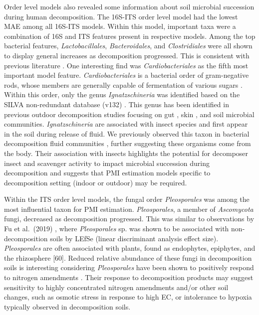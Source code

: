 \documentclass[
  10pt,
  letterpaper,
]{article}
\begin{document}
Order level models also revealed some information about soil microbial
succession during human decomposition. The 16S-ITS order level model had
the lowest MAE among all 16S-ITS models. Within this model, important
taxa were a combination of 16S and ITS features present in respective
models. Among the top bacterial features, \emph{Lactobacillales},
\emph{Bacteroidales}, and \emph{Clostridiales} were all shown to display
general increases as decomposition progressed. This is consistent with
previous literature \citep{cobaugh_functional_2015}. One interesting
find was \emph{Cardiobacteriales} as the fifth most important model
feature. \emph{Cardiobacteriales} is a bacterial order of gram-negative
rods, whose members are generally capable of fermentation of various
sugars \citep{garrity_order_2007}. Within this order, only the genus
\emph{Ignatzschineria} was identified based on the SILVA non-redundant
database (v132) \citep{quast_silva_2013}. This genus has been identified
in previous outdoor decomposition studies focusing on gut
\citep{debruyn_postmortem_2017}, skin \citep{hyde_initial_2015}, and
soil \citep{cobaugh_functional_2015} microbial communities.
\emph{Ignatzschineria} are associated with insect species
\citep{toth_proposal_2007, gupta_ignatzschineria_2011} and first appear
in the soil during release of fluid. We previously observed this taxon
in bacterial decomposition fluid communities \citep{mason_body_2022},
further suggesting these organisms come from the body. Their association
with insects highlights the potential for decomposer insect and
scavenger activity to impact microbial succession during decomposition
and suggests that PMI estimation models specific to decomposition
setting (indoor or outdoor) may be required.

Within the ITS order level models, the fungal order \emph{Pleosporales}
was among the most influential taxon for PMI estimation.
\emph{Pleosporales}, a member of \emph{Ascomycota} fungi, decreased as
decomposition progressed. This was similar to observations by Fu et
al.~(2019) \citep{fu_fungal_2019}, where \emph{Pleosporales} sp. was
shown to be associated with non-decomposition soils by LEfSe (linear
discriminant analysis effect size). \emph{Pleosporales} are often
associated with plants, found as endophytes, epiphytes, and the
rhizosphere {[}60{]}. Reduced relative abundance of these fungi in
decomposition soils is interesting considering \emph{Pleosporales} have
been shown to positively respond to nitrogen amendments
\citep{lowell_comparative_2001, she_resource_2018}. Their response to
decomposition products may suggest sensitivity to highly concentrated
nitrogen amendments and/or other soil changes, such as osmotic stress in
response to high EC, or intolerance to hypoxia typically observed in
decomposition soils.
\end{document}
